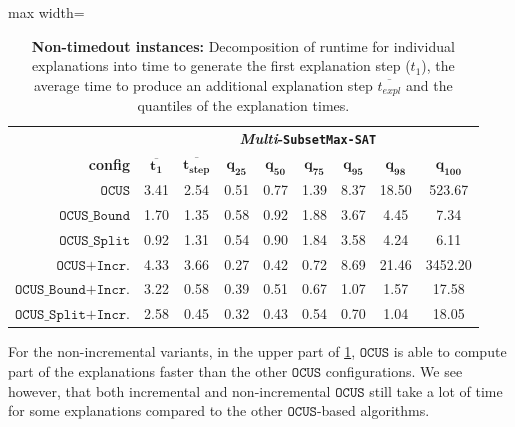 \documentclass[twoside,11pt]{article}
\newcommand\mm[1]{\ensuremath{#1}\xspace}
\newcommand\call[1]{\mm{\texttt{#1}}}
\newcommand\subsetmaxsat{\texttt{SubsetMax-SAT}}
\newcommand\comus{\mm{\call{OCUS}}}
\newcommand{\comusbound}{\mm{\call{OCUS\_Bound}}}
\newcommand\comusincr{\mm{\call{OCUS+Incr.}}}
\newcommand\ousbiter{\mm{\call{OCUS\_Split}}}
\newcommand\ousbincr{\mm{\call{OCUS\_Bound+Incr.}}}
\newcommand\ousbiterincr{\mm{\call{OCUS\_Split+Incr.}}}
\begin{document}
\begin{table}[!h]
	\centering
	\begin{adjustbox}{max width=\textwidth}
		\begin{tabular}{r|c|c|cccccc}
			& \multicolumn{8}{c}{\textbf{\emph{Multi}-\subsetmaxsat}}\\[1ex]
			\textbf{config}          & $\mathbf{\overline{t_{1}}}$  & $\mathbf{\overline{t_{step}}}$ &  $\mathbf{q_{25}}$ &  $\mathbf{q_{50}}$ &  $\mathbf{q_{75}}$  & $\mathbf{q_{95}}$ &  $\mathbf{q_{98}}$ & $\mathbf{q_{100}}$ \\ \midrule
			\comus          &              3.41 &        2.54 &  0.51 &  0.77 &  1.39 &  8.37 & 18.50 &  523.67 \\
			\comusbound     &              1.70 &        1.35 &  0.58 &  0.92 &  1.88 &  3.67 &  4.45 &    7.34 \\
			\ousbiter       &              0.92 &        1.31 &  0.54 &  0.90 &  1.84 &  3.58 &  4.24 &    6.11 \\ \hline
			\comusincr     &              4.33 &        3.66 &  0.27 &  0.42 &  0.72 &  8.69 & 21.46 & 3452.20 \\
			\ousbincr       &              3.22 &        0.58 &  0.39 &  0.51 &  0.67 &  1.07 &  1.57 &   17.58 \\
			\ousbiterincr   &              2.58 &        0.45 &  0.32 &  0.43 &  0.54 &  0.70 &  1.04 &   18.05 \\
		\end{tabular}
	\end{adjustbox}
	\caption{\textbf{Non-timedout instances:} Decomposition of runtime for individual explanations into time to generate the first explanation step ($t_1$), the average time to produce an additional explanation step $\overline{t_{expl}}$ and the quantiles of the explanation times.}
	\label{tab:indiv-explanations-all}
\end{table}

For the non-incremental variants, in the upper part of \cref{tab:indiv-explanations-all}, \comus is able to compute part of the explanations faster than the other \comus configurations. We see however, that both incremental and non-incremental \comus still take a lot of time for some explanations compared to the other \comus-based algorithms.

\end{document}
